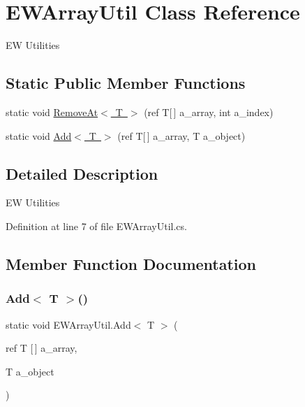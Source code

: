 \hypertarget{class_e_w_array_util}{}\section{E\+W\+Array\+Util Class Reference}
\label{class_e_w_array_util}


EW Utilities  


\subsection*{Static Public Member Functions}
\begin{DoxyCompactItemize}
\item 
static void \mbox{\hyperlink{class_e_w_array_util_a2e14d8ba3e93e455a84a6a706b8742d4}{Remove\+At$<$ T $>$}} (ref T\mbox{[}$\,$\mbox{]} a\+\_\+array, int a\+\_\+index)
\item 
static void \mbox{\hyperlink{class_e_w_array_util_af3befe5cbf8a439e700204c12aa4075b}{Add$<$ T $>$}} (ref T\mbox{[}$\,$\mbox{]} a\+\_\+array, T a\+\_\+object)
\end{DoxyCompactItemize}


\subsection{Detailed Description}
EW Utilities 



Definition at line 7 of file E\+W\+Array\+Util.\+cs.



\subsection{Member Function Documentation}
\mbox{\label{class_e_w_array_util_af3befe5cbf8a439e700204c12aa4075b}} 
\subsubsection{\texorpdfstring{Add$<$ T $>$()}{Add< T >()}}
{\footnotesize\ttfamily static void E\+W\+Array\+Util.\+Add$<$ T $>$ (\begin{DoxyParamCaption}\item[{ref T \mbox{[}$\,$\mbox{]}}]{a\+\_\+array,  }\item[{T}]{a\+\_\+object }\end{DoxyParamCaption})\hspace{0.3cm}{\ttfamily [static]}}



